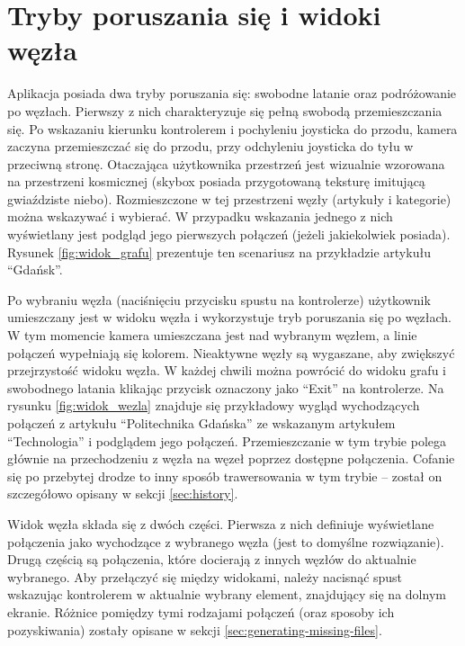 \section{Tryby poruszania się i widoki węzła}
\label{sec:tryby-widoki}
Aplikacja posiada dwa tryby poruszania się: swobodne latanie oraz podróżowanie po węzłach. Pierwszy z nich charakteryzuje się pełną swobodą przemieszczania się. Po wskazaniu kierunku kontrolerem i pochyleniu joysticka do przodu, kamera zaczyna przemieszczać się do przodu, przy odchyleniu joysticka do tyłu w przeciwną stronę. Otaczająca użytkownika przestrzeń jest wizualnie wzorowana na przestrzeni kosmicznej (skybox posiada przygotowaną teksturę imitującą gwiaździste niebo). Rozmieszczone w tej przestrzeni węzły (artykuły i kategorie) można wskazywać i wybierać. W przypadku wskazania jednego z nich wyświetlany jest podgląd jego pierwszych połączeń (jeżeli jakiekolwiek posiada). Rysunek \ref{fig:widok_grafu} prezentuje ten scenariusz na przykładzie artykułu ``Gdańsk''.


Po wybraniu węzła (naciśnięciu przycisku spustu na kontrolerze) użytkownik umieszczany jest w widoku węzła i wykorzystuje tryb poruszania się po węzłach. W tym momencie kamera umieszczana jest nad wybranym węzłem, a linie połączeń wypełniają się kolorem. Nieaktywne węzły są wygaszane, aby zwiększyć przejrzystość widoku węzła. W każdej chwili można powrócić do widoku grafu i swobodnego latania klikając przycisk oznaczony jako ``Exit'' na kontrolerze. Na rysunku \ref{fig:widok_wezla} znajduje się przykładowy wygląd wychodzących połączeń z artykułu ``Politechnika Gdańska'' ze wskazanym artykułem ``Technologia'' i podglądem jego połączeń. Przemieszczanie w tym trybie polega głównie na przechodzeniu z węzła na węzeł poprzez dostępne połączenia. Cofanie się po przebytej drodze to inny sposób trawersowania w tym trybie – został on szczegółowo opisany w sekcji \ref{sec:history}.


Widok węzła składa się z dwóch części. Pierwsza z nich definiuje wyświetlane połączenia jako wychodzące z wybranego węzła (jest to domyślne rozwiązanie). Drugą częścią są połączenia, które docierają z innych węzłów do aktualnie wybranego. Aby przełączyć się między widokami, należy nacisnąć spust wskazując kontrolerem w aktualnie wybrany element, znajdujący się na dolnym ekranie. Różnice pomiędzy tymi rodzajami połączeń (oraz sposoby ich pozyskiwania) zostały opisane w sekcji \ref{sec:generating-missing-files}.